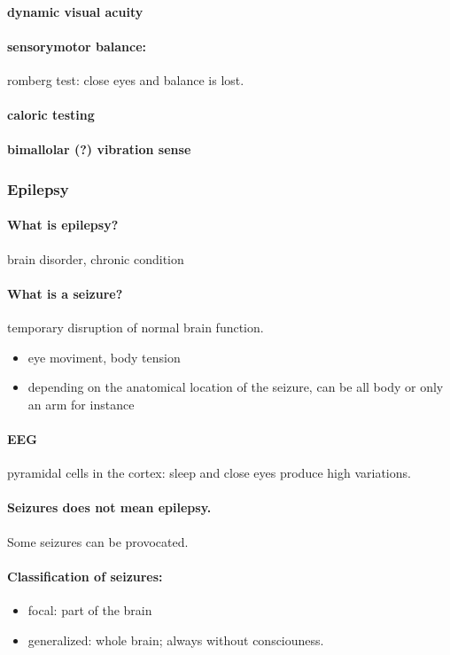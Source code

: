 \documentclass[12pt,article,oneside,a4paper]{memoir}
\begin{document}
\paragraph{dynamic visual acuity}

\paragraph{sensorymotor balance:} romberg test: close eyes and balance is lost.
\paragraph{caloric testing}
\paragraph{bimallolar (?) vibration sense}

\subsubsection{Epilepsy}
\paragraph{What is epilepsy?} brain disorder, chronic condition
\paragraph{What is a seizure?} temporary disruption of normal brain function.
\begin{itemize}
\item eye moviment, body tension
\item depending on the anatomical location of the seizure, can be all body or only an arm for instance
\end{itemize}
\paragraph{EEG} pyramidal cells in the cortex: sleep and close eyes produce high variations.
\paragraph{Seizures does not mean epilepsy.} Some seizures can be provocated.

\paragraph{Classification of seizures:}
\begin{itemize}
\item focal: part of the brain
\item generalized: whole brain; always without consciouness.
\end{itemize}
\end{document}
